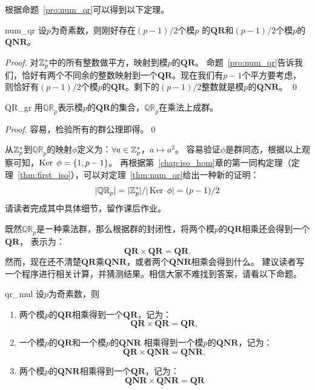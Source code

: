 根据命题~\ref{pro:num_qr}可以得到以下定理。
 \begin{theorem}{}{num_qr}
 设$p$为奇素数，则刚好存在$(p-1)/2$个模$p$ 的$\mathbf{QR}$和$(p-1)/2$个模$p$的$\mathbf{QNR}$。
 \end{theorem}
 \begin{proof}
 对${\mathbb Z}_p^*$中的所有整数做平方，映射到模$p$的$\mathbf{QR}$。
 命题~\ref{pro:num_qr}告诉我们，恰好有两个不同余的整数映射到一个$\mathbf{QR}$。现在我们有$p-1$个平方要考虑，
 则恰好有$(p-1)/2$个模$p$的$\mathbf{QR}$。剩下的$(p-1)/2$整数就是模$p$的$\mathbf{QNR}$。
 \qed
 \end{proof}
 
 \begin{proposition}{}{QR_gr}
  用$\mathbb{QR}_p$表示模$p$的$\mathbf{QR}$的集合，$\mathbb{QR}_p$在乘法上成群。
 \end{proposition}
  
  \begin{proof}
  容易，检验所有的群公理即得。\qed
  \end{proof}
  
 从${\mathbb Z}_p^*$到$\mathbb{QR}_p$的映射$\phi$定义为：$\forall a \in {\mathbb Z}_p^*$，$a \mapsto a^2$。
 容易验证$\phi$是群同态，根据以上观察可知，$\operatorname{Ker}\; \phi = \{1, p-1\}$。
 再根据第~\ref{chap:iso_hom}章的第一同构定理（定理~\ref{thm:first_iso}），可以对定理~\ref{thm:num_qr}给出一种新的证明：
  \[ |\mathbb{QR}_p| = | {\mathbb Z}_p^* |  / | \operatorname{Ker}\; \phi | = (p-1)/2 \]
  请读者完成其中具体细节，留作课后作业。
  
  既然$\mathbb{QR}_p$是一种乘法群，那么根据群的封闭性，将两个模$p$的$\mathbf{QR}$相乘还会得到一个$\mathbf{QR}$，
  表示为：
  \[\mathbf{QR} \times \mathbf{QR} = \mathbf{QR}. \]
  然而，现在还不清楚$\mathbf{QR}$乘$\mathbf{QNR}$，或者两个$\mathbf{QNR}$相乘会得到什么。
  建议读者写一个程序进行相关计算，并猜测结果。相信大家不难找到答案，请看以下命题。
  
  \begin{proposition}{}{qr_mul}
  设$p$为奇素数，则
  \begin{enumerate}
  \item 两个模$p$的$\mathbf{QR}$相乘得到一个$\mathbf{QR}$，记为：\[\mathbf{QR} \times \mathbf{QR} = \mathbf{QR},\]
  
  \item 一个模$p$的$\mathbf{QR}$和一个模$p$的$\mathbf{QNR}$ 相乘得到一个模$p$的$\mathbf{QNR}$，记为：\[\mathbf{QR} \times \mathbf{QNR} = \mathbf{QNR},\]
  
  \item 两个模$p$的$\mathbf{QNR}$相乘得到一个$\mathbf{QR}$，记为：\[\mathbf{QNR} \times \mathbf{QNR} = \mathbf{QR}\]
  \end{enumerate}
  \end{proposition}
  
